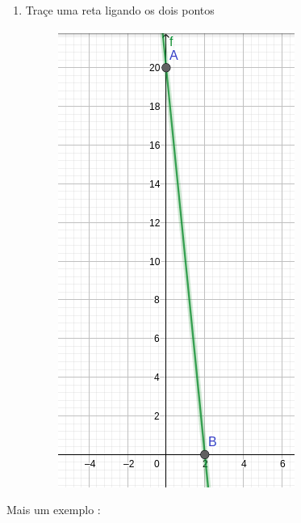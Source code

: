 \begin{multicols*}{2}
\begin{enumerate}
\begin{figure}[H]
            \end{figure}
            \item Traçe uma reta ligando os dois pontos
            \begin{figure}[H]
                \includegraphics[scale=0.3]{assets/rafael/img13.png}
            \end{figure}
            \end{enumerate}
             
             Mais um exemplo : 
             

\end{multicols*}
